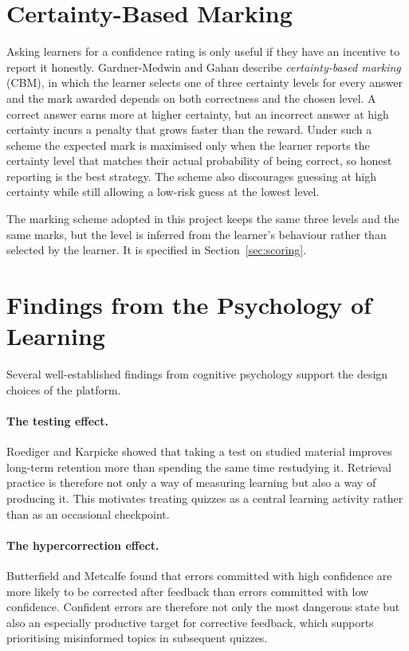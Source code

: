 \documentclass[12pt,a4paper,oneside]{report}
\begin{document}
\section{Certainty-Based Marking}

Asking learners for a confidence rating is only useful if they have an
incentive to report it honestly. Gardner-Medwin and Gahan
\cite{gardnermedwin2003} describe \emph{certainty-based marking} (CBM), in
which the learner selects one of three certainty levels for every answer
and the mark awarded depends on both correctness and the chosen level. A
correct answer earns more at higher certainty, but an incorrect answer at
high certainty incurs a penalty that grows faster than the reward. Under
such a scheme the expected mark is maximised only when the learner reports
the certainty level that matches their actual probability of being
correct, so honest reporting is the best strategy. The scheme also
discourages guessing at high certainty while still allowing a low-risk
guess at the lowest level.

The marking scheme adopted in this project keeps the same three levels and
the same marks, but the level is inferred from the learner's behaviour
rather than selected by the learner. It is specified in
Section~\ref{sec:scoring}.

\section{Findings from the Psychology of Learning}

Several well-established findings from cognitive psychology support the
design choices of the platform.

\paragraph{The testing effect.} Roediger and Karpicke \cite{roediger2006}
showed that taking a test on studied material improves long-term retention
more than spending the same time restudying it. Retrieval practice is
therefore not only a way of measuring learning but also a way of producing
it. This motivates treating quizzes as a central learning activity rather
than as an occasional checkpoint.

\paragraph{The hypercorrection effect.} Butterfield and Metcalfe
\cite{butterfield2001} found that errors committed with high confidence
are more likely to be corrected after feedback than errors committed with
low confidence. Confident errors are therefore not only the most dangerous
state but also an especially productive target for corrective feedback,
which supports prioritising misinformed topics in subsequent quizzes.
\end{document}
